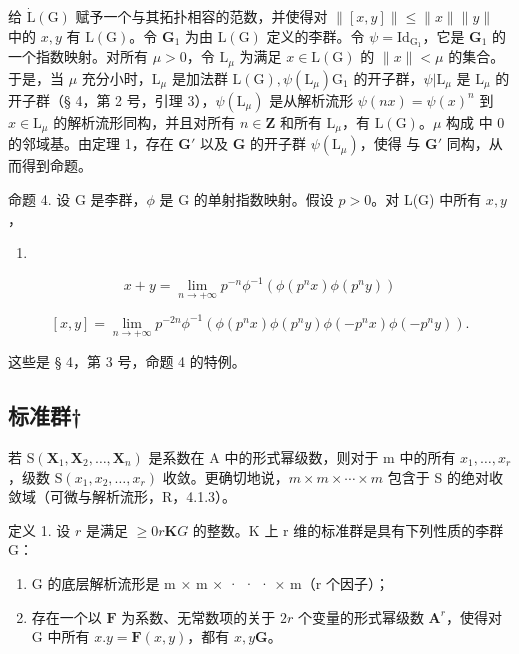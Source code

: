 给 \(\dot{\mathrm{L}}(\mathrm{G})\) 赋予一个与其拓扑相容的范数，并使得对 \(\| [x,y]\| \leqslant \| x\| \| y\|\) 中的 \(x,y\) 有 \(\mathrm{L}(\mathrm{G})\)。令 \(\mathbf{G}_1\) 为由 \(\mathrm{L}(\mathrm{G})\) 定义的李群。令 \(\psi = \mathrm{Id}_{\mathrm{G}_1}\)，它是 \(\mathbf{G}_1\) 的一个指数映射。对所有 \(\mu >0\)，令 \(\mathrm{L}_{\mu}\) 为满足 \(x\in \mathrm{L}(\mathrm{G})\) 的 \(\| x\| < \mu\) 的集合。于是，当 \(\mu\) 充分小时，\(\mathrm{L}_{\mu}\) 是加法群 \(\mathrm{L}(\mathrm{G}),\psi (\mathrm{L}_{\mu})\)\(\mathrm{G}_1\) 的开子群，\(\psi |\mathrm{L}_{\mu}\) 是 \(\mathrm{L}_{\mu}\) 的开子群（§ 4，第 2 号，引理 3），\(\psi (\mathrm{L}_{\mu})\) 是从解析流形 \(\psi (nx) = \psi (x)^n\) 到 \(x\in \mathrm{L}_{\mu}\) 的解析流形同构，并且对所有 \(n\in \mathbf{Z}\) 和所有 \(\mathrm{L}_{\mu}\)，有 \(\mathrm{L}(\mathrm{G})\)。\(\mu\) 构成  中 0 的邻域基。由定理 1，存在 \(\mathbf{G}'\) 以及 \(\mathbf{G}\) 的开子群 \(\psi (\mathrm{L}_{\mu})\)，使得  与 \(\mathbf{G}'\) 同构，从而得到命题。

命题 4. 设 G 是李群，\(\phi\) 是 G 的单射指数映射。假设 \(p > 0\)。对 L(G) 中所有 \(x, y\)，

\begin{enumerate}
\def\labelenumi{(\arabic{enumi})}
\tightlist
\item
\end{enumerate}

\[
x + y = \lim _ {n \rightarrow + \infty} p ^ {- n} \phi^ {- 1} (\phi (p ^ {n} x) \phi (p ^ {n} y))\tag{1}
\]

\[
[ x, y ] = \lim _ {n \rightarrow + \infty} p ^ {- 2 n} \phi^ {- 1} (\phi (p ^ {n} x) \phi (p ^ {n} y) \phi (- p ^ {n} x) \phi (- p ^ {n} y)).\tag{2}
\]

这些是 § 4，第 3 号，命题 4 的特例。

\subsection{标准群†}

若 \(\mathrm{S}(\mathbf{X}_{1},\mathbf{X}_{2},\ldots,\mathbf{X}_{n})\) 是系数在 A 中的形式幂级数，则对于 m 中的所有 \(x_{1},\ldots,x_{r}\)，级数 \(\mathrm{S}(x_{1},x_{2},\ldots,x_{r})\) 收敛。更确切地说，\(m\times m\times\cdots\times m\) 包含于 S 的绝对收敛域（可微与解析流形，R，4.1.3）。

定义 1. 设 \(r\) 是满足 \(\geqslant 0\)\(r\)\(\mathbf{K}\)\(G\) 的整数。K 上 r 维的标准群是具有下列性质的李群 G：

\begin{enumerate}
\def\labelenumi{(\roman{enumi})}
\item
  G 的底层解析流形是 m × m × · · · × m（r 个因子）；
\item
  存在一个以 \(\mathbf{F}\) 为系数、无常数项的关于 \(2r\) 个变量的形式幂级数 \(\mathbf{A}^r\)，使得对 G 中所有 \(x.y = \mathbf{F}(x,y)\)，都有 \(x,y\)\(\mathbf{G}\)。
\end{enumerate}

